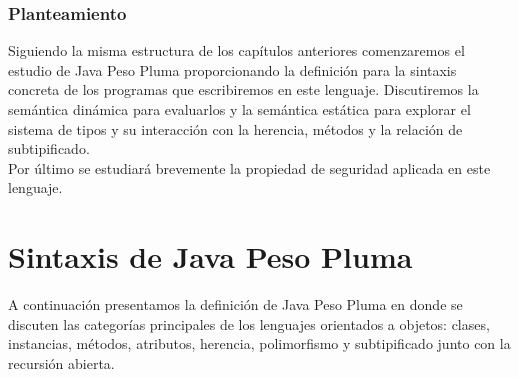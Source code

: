 \subsubsection{Planteamiento}
Siguiendo la misma estructura de los capítulos anteriores comenzaremos el estudio de \textsf{Java Peso Pluma} proporcionando la definición para la sintaxis concreta de los programas que escribiremos en este lenguaje. 
Discutiremos la semántica dinámica para evaluarlos y la semántica estática para explorar el sistema de tipos y su interacción con la herencia, métodos y la relación de subtipificado.\\
Por último se estudiará brevemente la propiedad de seguridad aplicada en este lenguaje.

\section{Sintaxis de Java Peso Pluma}
A continuación presentamos la definición de \textsf{Java Peso Pluma} en donde se discuten las categorías principales de los lenguajes orientados a objetos: clases, instancias, métodos, atributos, herencia, polimorfismo y subtipificado junto con la recursión abierta.

